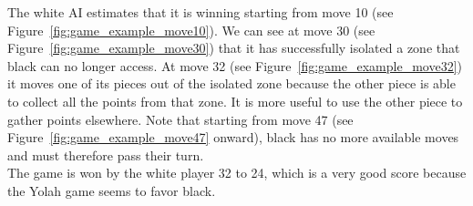 \documentclass[12pt,a4paper,twoside,openright]{book}
\begin{document}

The white AI estimates that it is winning starting from move 10 (see Figure~\ref{fig:game_example_move10}). We can see at move 30 (see Figure~\ref{fig:game_example_move30}) that it has successfully isolated a zone that black can no longer access. At move 32 (see Figure~\ref{fig:game_example_move32}) it moves one of its pieces out of the isolated zone because the other piece is able to collect all the points from that zone. It is more useful to use the other piece to gather points elsewhere. Note that starting from move 47 (see Figure~\ref{fig:game_example_move47} onward), black has no more available moves and must therefore pass their turn.\\


The game is won by the white player 32 to 24, which is a very good score because the Yolah game seems to favor black.

\end{document}
